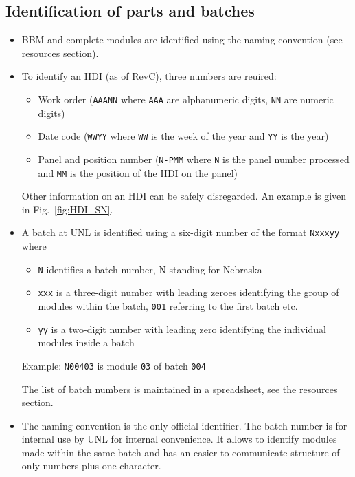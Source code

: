 \documentclass[12pt]{unlsilabsop}
\begin{document}
\subsection{Identification of parts and batches}
\begin{itemize}
    \item BBM and complete modules are identified using the naming convention (see resources section).
    \item To identify an HDI (as of RevC), three numbers are reuired:
    \begin{itemize}
	\item Work order (\texttt{AAANN} where \texttt{AAA} are alphanumeric digits, \texttt{NN} are numeric digits)
	\item Date code (\texttt{WWYY} where \texttt{WW} is the week of the year and \texttt{YY} is the year)
	\item Panel and position number (\texttt{N-PMM} where \texttt{N} is the panel number processed and \texttt{MM} is the position of the HDI on the panel)
    \end{itemize}
    Other information on an HDI can be safely disregarded. An example is given in Fig.~\ref{fig:HDI_SN}.
    \item A batch at UNL is identified using a six-digit number of the format \texttt{Nxxxyy} where
    \begin{itemize}
	\item \texttt{N} identifies a batch number, N standing for Nebraska
	\item \texttt{xxx} is a three-digit number with leading zeroes identifying the group of modules within the batch, \texttt{001} referring to the first batch etc.
	\item \texttt{yy} is a two-digit number with leading zero identifying the individual modules inside a batch
    \end{itemize}
    Example: \texttt{N00403} is module \texttt{03} of batch \texttt{004}

    The list of batch numbers is maintained in a spreadsheet, see the resources section.
    \item The naming convention is the only official identifier. The batch number is for internal use by UNL for internal convenience. It allows to identify modules made within the same batch and has an easier to communicate structure of only numbers plus one character.
\end{itemize}
\end{document}
